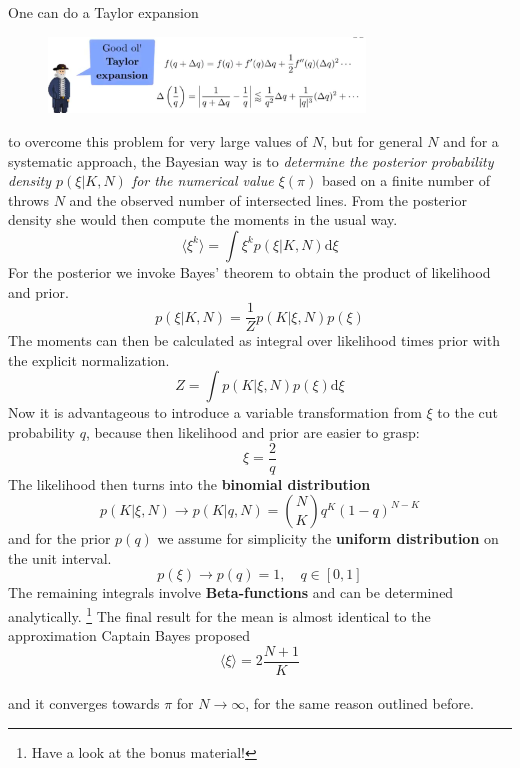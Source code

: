 \documentclass[12pt, a4paper]{scrartcl}
\begin{document}
One can do a Taylor expansion%
 \begin{figure}[H]
	\centering
	\includegraphics[width=0.75\textwidth]{9_3.png}
\end{figure}
 to
overcome this problem for very large values of $N$, but for general $N$ and
for a systematic approach, the Bayesian way is to \textit{determine the posterior
probability density $p(\xi|K,N)$ for the numerical value $\xi(\pi)$} based on a
finite number of throws $N$ and the observed number of intersected lines.
From the posterior density she would then compute the
moments in the usual way.
\[\langle \xi^k\rangle = \int \xi^kp(\xi|K,N)\text{d}\xi\]
For the posterior we invoke Bayes’ theorem to obtain the product of likelihood
and prior.
\[p(\xi|K,N)=\frac 1Z p(K|\xi,N)p(\xi)\]
The moments can then be calculated as integral over likelihood times prior
with the explicit normalization.
\[Z=\int p(K|\xi,N)p(\xi)\text{d}\xi\]
Now it is advantageous to introduce a variable transformation from $\xi$ to the
cut probability $q$, because then likelihood and prior are
easier to grasp:
\[\xi=\frac 2q\]
The likelihood then turns into  the  \textbf{binomial distribution}
\[p(K|\xi,N)\rightarrow p(K|q,N)={N\choose K} q^K(1-q)^{N-K}\]
and for the prior $p(q)$ we assume for simplicity the  \textbf{uniform distribution} on
the unit interval. \[p(\xi)\rightarrow p(q)=1, \quad q\in[0,1]\]
The remaining integrals involve  \textbf{Beta-functions} and can be
determined analytically. \footnote{Have a look at the bonus material!} The final result for the mean is almost identical to
the approximation Captain Bayes proposed 
\begin{equation*}\boxed{\langle \xi\rangle = 2\frac{N+1}{K}
}\end{equation*}\\
and it converges towards $\pi$ for $N\rightarrow \infty$, for the same reason outlined before.\\
\end{document}
